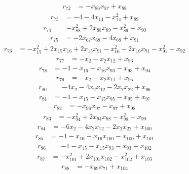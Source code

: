 \begin{align*}
r_{72}&=
-x_{86}x_{87}+x_{88}
\end{align*}
\begin{align*}
r_{73}&=
-4-4x_{14}-x_{14}^{2}+x_{89}
\end{align*}
\begin{align*}
r_{74}&=
-x_{88}^{2}+2x_{88}x_{89}-x_{89}^{2}+x_{90}
\end{align*}
\begin{align*}
r_{75}&=
-2x_{67}x_{68}-4x_{68}+x_{91}
\end{align*}
\begin{align*}
r_{76}&=
-x_{15}^{2}+2x_{15}x_{16}+2x_{15}x_{91}-x_{16}^{2}-2x_{16}x_{91}-x_{91}^{2}+x_{92}
\end{align*}
\begin{align*}
r_{77}&=
-x_{2}-x_{2}x_{12}+x_{93}
\end{align*}
\begin{align*}
r_{78}&=
-1-x_{16}-x_{16}x_{93}-x_{93}+x_{94}
\end{align*}
\begin{align*}
r_{79}&=
-x_{2}-x_{2}x_{11}+x_{95}
\end{align*}
\begin{align*}
r_{80}&=
-4x_{2}-4x_{2}x_{12}-2x_{2}x_{22}+x_{96}
\end{align*}
\begin{align*}
r_{81}&=
-1-x_{15}-x_{15}x_{95}-x_{95}+x_{97}
\end{align*}
\begin{align*}
r_{82}&=
-x_{96}x_{97}-x_{97}+x_{98}
\end{align*}
\begin{align*}
r_{83}&=
-x_{94}^{2}+2x_{94}x_{98}-x_{98}^{2}+x_{99}
\end{align*}
\begin{align*}
r_{84}&=
-6x_{2}-4x_{2}x_{12}-2x_{2}x_{22}+x_{100}
\end{align*}
\begin{align*}
r_{85}&=
-1-x_{16}-x_{16}x_{100}-x_{100}+x_{101}
\end{align*}
\begin{align*}
r_{86}&=
-1-x_{15}-x_{15}x_{93}-x_{93}+x_{102}
\end{align*}
\begin{align*}
r_{87}&=
-x_{101}^{2}+2x_{101}x_{102}-x_{102}^{2}+x_{103}
\end{align*}
\begin{align*}
r_{88}&=
-x_{69}x_{71}+x_{104}
\end{align*}
